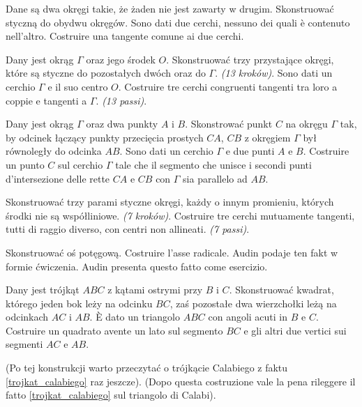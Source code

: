 \begin{problem}
    Dane są dwa okręgi takie, że żaden nie jest zawarty w drugim. %
    Skonstruować styczną do obydwu okręgów. %
    Sono dati due cerchi, nessuno dei quali è contenuto nell'altro. %
    Costruire una tangente comune ai due cerchi. %
\end{problem}

\begin{problem}
    Dany jest okrąg $\Gamma$ oraz jego środek $O$. %
    Skonstruować trzy przystające okręgi, które są styczne do pozostałych dwóch oraz do $\Gamma$. %
    \hfill \emph{(13 kroków)}. %
    Sono dati un cerchio $\Gamma$ e il suo centro $O$. %
    Costruire tre cerchi congruenti tangenti tra loro a coppie e tangenti a $\Gamma$. %
    \hfill \emph{(13 passi)}. %
\end{problem}

\begin{problem}
    Dany jest okrąg $\Gamma$ oraz dwa punkty $A$ i $B$. %
    Skonstrować punkt $C$ na okręgu $\Gamma$ tak, by odcinek łączący punkty przecięcia prostych $CA$, $CB$ z okręgiem $\Gamma$ był równoległy do odcinka $AB$. %
    Sono dati un cerchio $\Gamma$ e due punti $A$ e $B$. %
    Costruire un punto $C$ sul cerchio $\Gamma$ tale che il segmento che unisce i secondi punti d'intersezione delle rette $CA$ e $CB$ con $\Gamma$ sia parallelo ad $AB$. %
\end{problem}

\begin{problem}
    Skonstruować trzy parami styczne okręgi, każdy o innym promieniu, których środki nie są współliniowe. %
    \hfill \emph{(7 kroków)}. %
    Costruire tre cerchi mutuamente tangenti, tutti di raggio diverso, con centri non allineati. %
    \hfill \emph{(7 passi)}. %
\end{problem}

Skonstruować oś potęgową. %
Costruire l'asse radicale. %
Audin \cite[s. 107]{audin_2003} podaje ten fakt w formie ćwiczenia. %
Audin \cite[p. 107]{audin_2003} presenta questo fatto come esercizio. %

\begin{problem}
\label{konstrukcja_kwadratu_wpisanego}%
    Dany jest trójkąt $ABC$ z kątami ostrymi przy $B$ i $C$. %
    Skonstruować kwadrat, którego jeden bok leży na odcinku $BC$, zaś pozostałe dwa wierzchołki leżą na odcinkach $AC$ i $AB$. %
    È dato un triangolo $ABC$ con angoli acuti in $B$ e $C$. %
    Costruire un quadrato avente un lato sul segmento $BC$ e gli altri due vertici sui segmenti $AC$ e $AB$. %
\end{problem}

(Po tej konstrukcji warto przeczytać o trójkącie Calabiego z faktu \ref{trojkat_calabiego} raz jeszcze). %
(Dopo questa costruzione vale la pena rileggere il fatto \ref{trojkat_calabiego} sul triangolo di Calabi). %

%